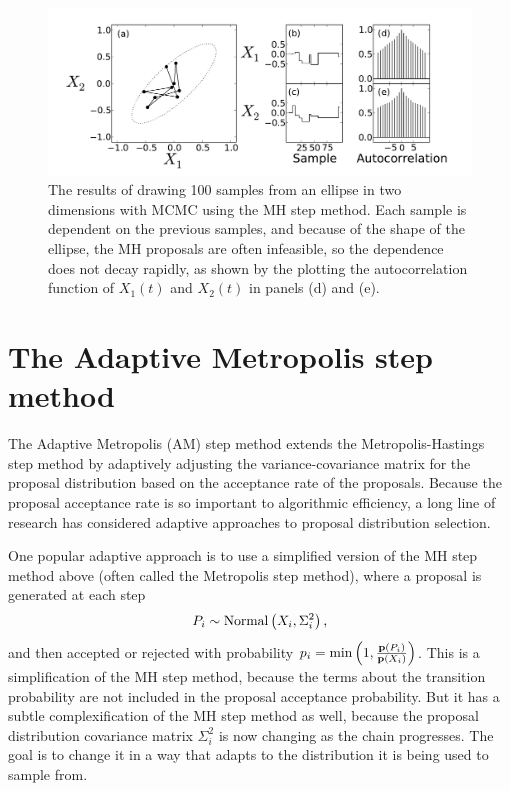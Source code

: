 \begin{figure}[ht]
\begin{center}
\includegraphics[width=\textwidth]{metropolis-ball.pdf}
\caption{The results of drawing 100 samples from an ellipse in two
  dimensions with MCMC using the MH step method.  Each sample is
  dependent on the previous samples, and because of the shape of the
  ellipse, the MH proposals are often infeasible, so the dependence
  does not decay rapidly, as shown by the plotting the autocorrelation
  function of $X_1(t)$ and $X_2(t)$ in panels (d) and (e).}
\label{metropolis-ball}
\end{center}
\end{figure}


\section{The Adaptive Metropolis step method}
The Adaptive Metropolis (AM) step method extends the
Metropolis-Hastings step method by adaptively adjusting the
variance-covariance matrix for the proposal distribution based on the
acceptance rate of the proposals.\cite{Harrio_paper_cited_in_PyMC}
Because the proposal acceptance rate is so important to algorithmic
efficiency, a long line of research has considered adaptive approaches
to proposal distribution selection.\cite{refs_from_harrio_and_others}

One popular adaptive approach is to use a simplified version of the MH
step method above (often called the Metropolis step method), where a
proposal is generated at each step
\[
P_i \sim \operatorname{Normal}\left(X_i, \Sigma^2_i\right),
\]
and then accepted or rejected with probability $p_i = \min\left(1,
\frac{\mathbf{p}(P_i)}{\mathbf{p}(X_i)}\right)$.  This is a simplification of
the MH step method, because the terms about the transition probability
are not included in the proposal acceptance probability.  But it has a
subtle complexification of the MH step method as well, because the
proposal distribution covariance matrix $\Sigma^2_i$ is now changing
as the chain progresses.  The goal is to change it in a way that
adapts to the distribution it is being used to sample from.

